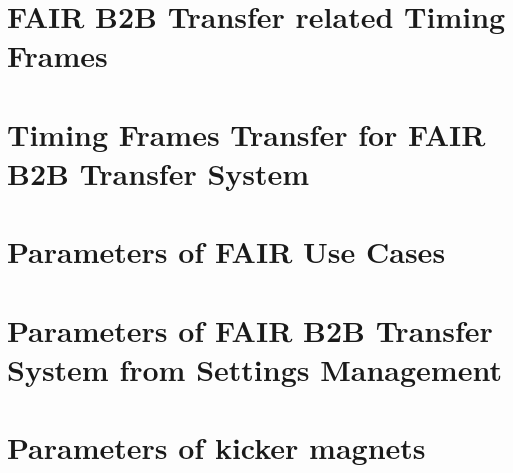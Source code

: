 \documentclass[12pt,twoside]{report}
\begin{document}
%
\appendix
\chapter{FAIR B2B Transfer related Timing Frames}

\chapter{Timing Frames Transfer for FAIR B2B Transfer System}

\chapter{Parameters of FAIR Use Cases}

\chapter{Parameters of FAIR B2B Transfer System from Settings Management}

\chapter{Parameters of kicker magnets}







\printnoidxglossary

\printnoidxglossary[type=abbreslist,style=long]
\printnoidxglossary[type=symbolslist,style=long]

\cleardoublepage
{}
\listoffigures %
\cleardoublepage
{}
\listoftables %



\renewcommand\chaptername{Publications}
\pagestyle{empty}


\renewcommand\chaptername{}
\pagestyle{empty}

%
\end{document}
